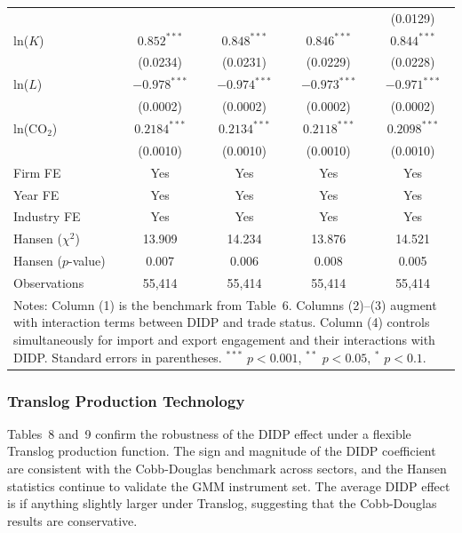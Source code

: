 \documentclass[11pt,a4paper]{article}
\begin{document}
\begin{table}[htbp]
\begin{tabular}{lcccc}
                         &          &          &          & (0.0129) \\
ln($K$)                  & $0.852^{***}$ & $0.848^{***}$ & $0.846^{***}$ & $0.844^{***}$ \\
                         & (0.0234) & (0.0231) & (0.0229) & (0.0228) \\
ln($L$)                  & $-0.978^{***}$ & $-0.974^{***}$ & $-0.973^{***}$ & $-0.971^{***}$ \\
                         & (0.0002) & (0.0002) & (0.0002) & (0.0002) \\
ln(CO$_2$)               & $0.2184^{***}$ & $0.2134^{***}$ & $0.2118^{***}$ & $0.2098^{***}$ \\
                         & (0.0010) & (0.0010) & (0.0010) & (0.0010) \\
Firm FE                  & Yes & Yes & Yes & Yes \\
Year FE                  & Yes & Yes & Yes & Yes \\
Industry FE              & Yes & Yes & Yes & Yes \\
Hansen ($\chi^2$)            & 13.909 & 14.234 & 13.876 & 14.521 \\
Hansen ($p$-value)           & 0.007  & 0.006  & 0.008  & 0.005  \\
Observations             & 55{,}414 & 55{,}414 & 55{,}414 & 55{,}414 \\
\bottomrule
\multicolumn{5}{p{\textwidth}}{\footnotesize Notes: Column (1) is the benchmark from Table~6. Columns (2)--(3) augment with interaction terms between DIDP and trade status. Column (4) controls simultaneously for import and export engagement and their interactions with DIDP. Standard errors in parentheses. $^{***}$ $p<0.001$, $^{**}$ $p<0.05$, $^{*}$ $p<0.1$.}
\end{tabular}
\end{table}


\subsubsection{Translog Production Technology}



Tables~8 and~9 confirm the robustness of the DIDP effect under a flexible Translog production function. The sign and magnitude of the DIDP coefficient are consistent with the Cobb-Douglas benchmark across sectors, and the Hansen statistics continue to validate the GMM instrument set. The average DIDP effect is if anything slightly larger under Translog, suggesting that the Cobb-Douglas results are conservative.
\end{document}
